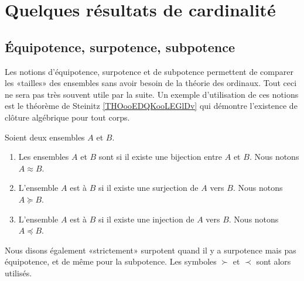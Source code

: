 
\section{Quelques résultats de cardinalité}

\subsection{Équipotence, surpotence, subpotence}

Les notions d'équipotence, surpotence et de subpotence permettent de comparer les «tailles» des ensembles sans avoir besoin de la théorie des ordinaux. Tout ceci ne sera pas très souvent utile par la suite. Un exemple d'utilisation de ces notions est le théorème de Steinitz \ref{THOooEDQKooLEGlDv} qui démontre l'existence de clôture algébrique pour tout corps.

\begin{definition}      \label{DEFooXGXZooIgcBCg}
    Soient deux ensembles \( A\) et \( B\).
    \begin{enumerate}
        \item
            Les ensembles \( A\) et \( B\) sont  si il existe une bijection entre \( A\) et \( B\). Nous notons \( A\approx B\).
        \item
            L'ensemble \( A\) est  à \( B\) si il existe une surjection de \( A\) vers \( B\). Nous notons \( A\succeq B\).
        \item
            L'ensemble \( A\) est  à \( B\) si il existe une injection de \( A\) vers \( B\). Nous notons \( A\preceq B\).
    \end{enumerate}
    Nous disons également «strictement» surpotent quand il y a surpotence mais pas équipotence, et de même pour la subpotence. Les symboles \( \succ\) et \( \prec\) sont alors utilisés.
\end{definition}

